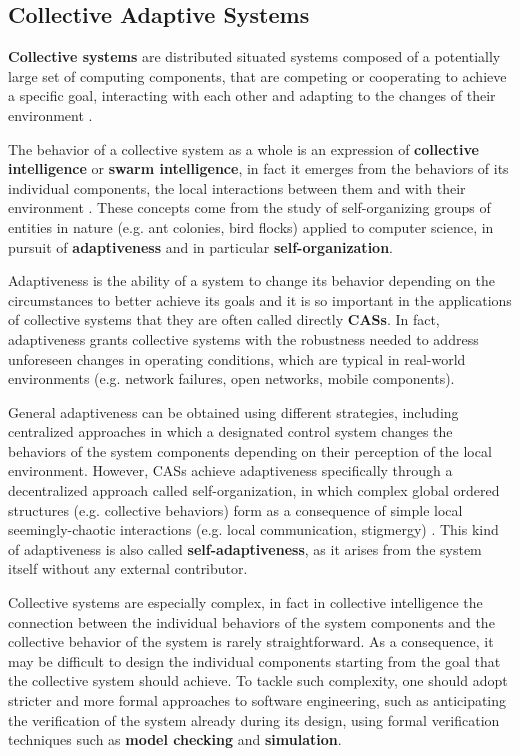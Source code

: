 
\subsection{Collective Adaptive Systems}

\textbf{Collective systems} are distributed situated systems composed of a
potentially large set of computing components, that are competing or cooperating
to achieve a specific goal, interacting with each other and adapting to the
changes of their environment \cite{CAS}.

The behavior of a collective system as a whole is an expression of
\textbf{collective intelligence} or \textbf{swarm intelligence}, in fact it
emerges from the behaviors of its individual components, the local interactions
between them and with their environment \cite{SwarmIntelligence}. These
concepts come from the study of self-organizing groups of entities in nature
(e.g. ant colonies, bird flocks) applied to computer science, in pursuit of
\textbf{adaptiveness} and in particular \textbf{self-organization}.

Adaptiveness is the ability of a system to change its behavior depending on the
circumstances to better achieve its goals and it is so important in the
applications of collective systems that they are often called directly
\textbf{\acp{CAS}}. In fact, adaptiveness grants collective systems with the
robustness needed to address unforeseen changes in operating conditions, which
are typical in real-world environments (e.g. network failures, open networks,
mobile components).

General adaptiveness can be obtained using different strategies, including
centralized approaches in which a designated control system changes the
behaviors of the system components depending on their perception of the local
environment. However, \acp{CAS} achieve adaptiveness specifically through a
decentralized approach called self-organization, in which complex global
ordered structures (e.g. collective behaviors) form as a consequence of simple
local seemingly-chaotic interactions (e.g. local communication, stigmergy)
\cite{SelfOrganization}. This kind of adaptiveness is also called
\textbf{self-adaptiveness}, as it arises from the system itself without any
external contributor.

Collective systems are especially complex, in fact in collective intelligence
the connection between the individual behaviors of the system components and
the collective behavior of the system is rarely straightforward. As a
consequence, it may be difficult to design the individual components starting
from the goal that the collective system should achieve. To tackle such
complexity, one should adopt stricter and more formal approaches to software
engineering, such as anticipating the verification of the system already during
its design, using formal verification techniques such as \textbf{model
checking} and \textbf{simulation}.


